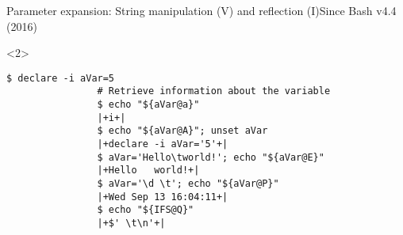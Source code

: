 \begin{frame}[fragile]{Parameter expansion: String manipulation (V) and reflection (I)}{Since Bash v4.4 (2016)}
\begin{overlayarea}{\textwidth}{0.5\textheight}
\begin{onlyenv}
        \end{onlyenv}
        \begin{onlyenv}<2>
            \begin{lstlisting}[style=MyBash, style=oddnumbers, aboveskip=3mm]
                $ declare -i aVar=5
                # Retrieve information about the variable
                $ echo "${aVar@a}"
                |+i+|
                $ echo "${aVar@A}"; unset aVar
                |+declare -i aVar='5'+|
                $ aVar='Hello\tworld!'; echo "${aVar@E}"
                |+Hello   world!+|
                $ aVar='\d \t'; echo "${aVar@P}"
                |+Wed Sep 13 16:04:11+|
                $ echo "${IFS@Q}"
                |+$' \t\n'+|
            \end{lstlisting}
        \end{onlyenv}
    \end{overlayarea}
\end{frame}
